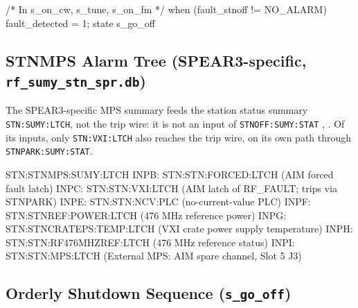 \begin{codeblock}
/* In s_on_cw, s_tune, s_on_fm */
when (fault_stnoff != NO_ALARM) {
    fault_detected = 1;
} state s_go_off
\end{codeblock}

\subsection{\texorpdfstring{STNMPS Alarm Tree (SPEAR3-specific, \texttt{rf\_\allowbreak{}sumy\_\allowbreak{}stn\_\allowbreak{}spr.\allowbreak{}db})}{STNMPS Alarm Tree (SPEAR3-specific, rf\_sumy\_stn\_spr.db)}}\label{sec:snl-stnmps}


The SPEAR3-specific MPS summary feeds the station status summary \texttt{STN:\allowbreak{}SUMY:\allowbreak{}LTCH}, not the trip wire: it is not an input of \texttt{STNOFF:\allowbreak{}SUMY:\allowbreak{}STAT} , . Of its inputs, only \texttt{STN:VXI:LTCH} also reaches the trip wire, on its own path through \texttt{STNPARK:\allowbreak{}SUMY:\allowbreak{}STAT}.

\begin{sigblock}
{STN}:STNMPS:SUMY:LTCH
    INPB: {STN}:STN:FORCED:LTCH    (AIM forced fault latch)
    INPC: {STN}:STN:VXI:LTCH       (AIM latch of RF_FAULT; trips via STNPARK)
    INPE: {STN}:STN:NCV:PLC        (no-current-value PLC)
    INPF: {STN}:STNREF:POWER:LTCH  (476 MHz reference power)
    INPG: {STN}:STNCRATEPS:TEMP:LTCH (VXI crate power supply temperature)
    INPH: {STN}:STN:RF476MHZREF:LTCH (476 MHz reference status)
    INPI: {STN}:STN:MPS:LTCH        (External MPS: AIM spare channel, Slot 5 J3)
\end{sigblock}

\subsection{\texorpdfstring{Orderly Shutdown Sequence (\texttt{s\_go\_off})}{Orderly Shutdown Sequence (s\_go\_off)}}\label{sec:snl-shutdown}


